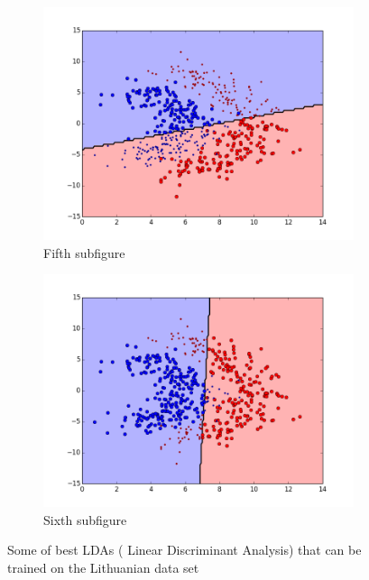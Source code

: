 \begin{figure}[t!]
\medskip
\begin{subfigure}{0.48\textwidth}
\includegraphics[width=\linewidth]{figs/Lithuanian/118All-Classifiers}
\caption{Fifth subfigure} \label{fig:Lithuanian_all_single_e}
\end{subfigure}\hspace*{\fill}
\begin{subfigure}{0.48\textwidth}
\includegraphics[width=\linewidth]{figs/Lithuanian/146All-Classifiers}
\caption{Sixth subfigure} \label{fig:Lithuanian_all_single_f}
\end{subfigure}

\caption{Some of best LDAs ( Linear Discriminant Analysis) that can be trained on the Lithuanian data set} \label{fig:Lithuanian_all_single}
\end{figure}

